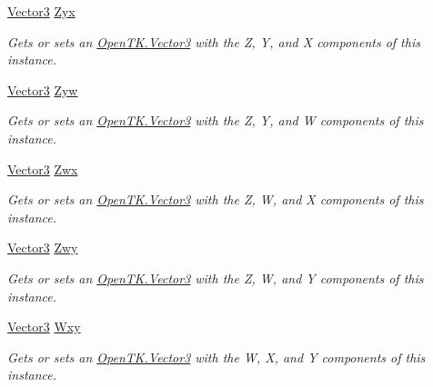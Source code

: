 \begin{DoxyCompactItemize}
\hyperlink{struct_open_t_k_1_1_vector3}{Vector3} \hyperlink{struct_open_t_k_1_1_vector4_ad2129a92b63e940bc2348b5fc0b166c9}{Zyx}
\begin{DoxyCompactList}\small\item\em Gets or sets an \hyperlink{struct_open_t_k_1_1_vector3}{Open\-T\-K.\-Vector3} with the Z, Y, and X components of this instance. \end{DoxyCompactList}\item 
\hyperlink{struct_open_t_k_1_1_vector3}{Vector3} \hyperlink{struct_open_t_k_1_1_vector4_a9594de4b64544f1387b8dd76f7568936}{Zyw}
\begin{DoxyCompactList}\small\item\em Gets or sets an \hyperlink{struct_open_t_k_1_1_vector3}{Open\-T\-K.\-Vector3} with the Z, Y, and W components of this instance. \end{DoxyCompactList}\item 
\hyperlink{struct_open_t_k_1_1_vector3}{Vector3} \hyperlink{struct_open_t_k_1_1_vector4_afe3b5e6536855e02a9a287e5aa85b067}{Zwx}
\begin{DoxyCompactList}\small\item\em Gets or sets an \hyperlink{struct_open_t_k_1_1_vector3}{Open\-T\-K.\-Vector3} with the Z, W, and X components of this instance. \end{DoxyCompactList}\item 
\hyperlink{struct_open_t_k_1_1_vector3}{Vector3} \hyperlink{struct_open_t_k_1_1_vector4_a12fd3a0b6ac4841b95ea39a34cc10493}{Zwy}
\begin{DoxyCompactList}\small\item\em Gets or sets an \hyperlink{struct_open_t_k_1_1_vector3}{Open\-T\-K.\-Vector3} with the Z, W, and Y components of this instance. \end{DoxyCompactList}\item 
\hyperlink{struct_open_t_k_1_1_vector3}{Vector3} \hyperlink{struct_open_t_k_1_1_vector4_a807d0c7618a918e3b3fffea9639bba41}{Wxy}
\begin{DoxyCompactList}\small\item\em Gets or sets an \hyperlink{struct_open_t_k_1_1_vector3}{Open\-T\-K.\-Vector3} with the W, X, and Y components of this instance. \end{DoxyCompactList}\item 

\end{DoxyCompactItemize}
